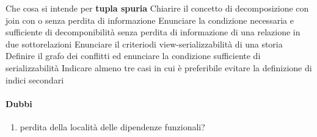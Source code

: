 \documentclass{exam}
\begin{document}
\begin{questions}
    \question Che cosa si intende per \textbf{tupla spuria}
    \question Chiarire il concetto di decomposizione con join con o senza perdita di informazione
    \question Enunciare la condizione necessaria e sufficiente di decomponibilità senza perdita di informazione di una relazione in due sottorelazioni
    \question Enunciare il criteriodi view-serializzabilità di una storia
    \question Definire il grafo dei conflitti ed enunciare la condizione sufficiente di serializzabilità
    \question Indicare almeno tre casi in cui è preferibile evitare la definizione di indici secondari
\end{questions}



\paragraph{Dubbi}
\begin{enumerate}
    \item perdita della località delle dipendenze funzionali?
\end{enumerate}
\end{document}
